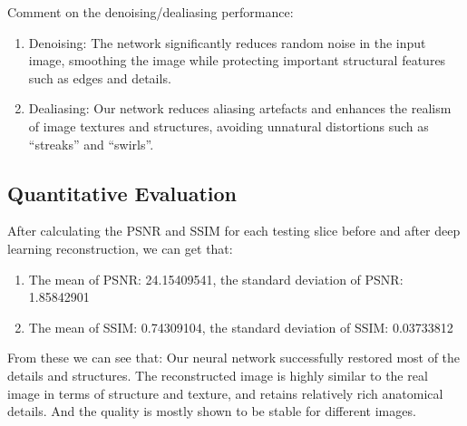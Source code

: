 \documentclass{article}
\begin{document}
Comment on the denoising/dealiasing performance:
\begin{enumerate} 
  \item Denoising: The network significantly reduces random noise in the input image,
        smoothing the image while protecting important structural features such as edges and details.
  \item Dealiasing: Our network reduces aliasing artefacts and enhances the realism of image
        textures and structures, avoiding unnatural distortions such as “streaks” and “swirls”.
\end{enumerate}

\subsection{Quantitative Evaluation}
After calculating the PSNR and SSIM for each testing slice before and after deep
learning reconstruction, we can get that:
\begin{enumerate}
  \item The mean of PSNR: 24.15409541, the standard deviation of PSNR: 1.85842901
  \item The mean of SSIM: 0.74309104, the standard deviation of SSIM: 0.03733812
\end{enumerate}
From these we can see that: Our neural network successfully restored most of the details 
and structures. The reconstructed image is highly similar to the real image in terms 
of structure and texture, and retains relatively rich anatomical details. 
And the quality is mostly shown to be stable for different images.
\end{document}

